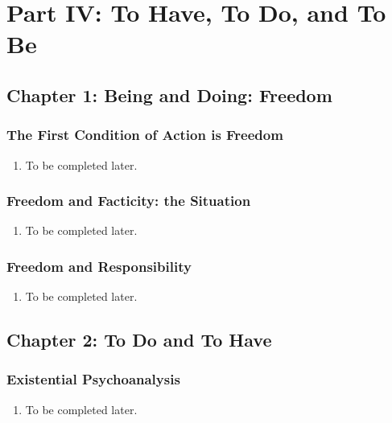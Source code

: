 \chapter{Part IV: To Have, To Do, and To Be}

\section{Chapter 1: Being and Doing: Freedom}

\subsection{The First Condition of Action is Freedom}

\begin{enumerate}
  \item To be completed later.
\end{enumerate}

\subsection{Freedom and Facticity: the Situation}

\begin{enumerate}
  \item To be completed later.
\end{enumerate}

\subsection{Freedom and Responsibility}

\begin{enumerate}
  \item To be completed later.
\end{enumerate}

\section{Chapter 2: To Do and To Have}

\subsection{Existential Psychoanalysis}

\begin{enumerate}
  \item To be completed later.
\end{enumerate}

